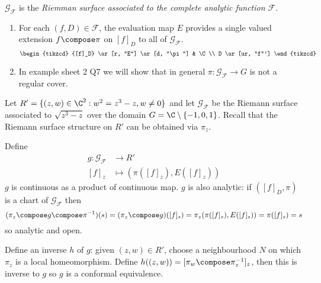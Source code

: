 \documentclass[a4paper]{article}
\begin{document}
\begin{definition}
  \(\mathcal G_{\mathcal F}\) is the \emph{Riemman surface associated to the complete analytic function \(\mathcal F\)}.
\end{definition}

\begin{remark}\leavevmode
  \begin{enumerate}
  \item For each \((f, D) \in \mathcal F\), the evaluation map \(E\) provides a single valued extension \(f \compose \pi\) on \([f]_D\) to all of \(\mathcal G_{\mathcal F}\).
    \[
      \begin{tikzcd}
        {[f]_D} \ar[r, "E"] \ar[d, "\pi"] & \C \\
        D \ar[ur, "f"']
      \end{tikzcd}
    \]
  \item In example sheet 2 Q7 we will show that in general \(\pi: \mathcal G_{\mathcal F} \to G\) is not a regular cover.
  \end{enumerate}
\end{remark}

\begin{eg}
  Let \(R' = \{(z, w) \in \C^2: w^2 = z^3 - z, w \neq 0\}\) and let \(\mathcal G_{\mathcal F}\) be the Riemann surface associated to \(\sqrt{z^3 - z}\) over the domain \(G = \C \setminus\{-1, 0, 1\}\). Recall that the Riemann surface structure on \(R'\) can be obtained via \(\pi_z\).

  Define
  \begin{align*}
    g: \mathcal G_{\mathcal F} &\to R' \\
    [f]_z &\mapsto (\pi([f]_z), E([f]_z))
  \end{align*}
  \(g\) is continuous as a product of continuous map. \(g\) is also analytic: if \(([f]_D, \pi)\) is a chart of \(\mathcal G_{\mathcal F}\) then
  \[
    (\pi_z \compose g \compose \pi^{-1})(s) = (\pi_z \compose g)([f]_s) = \pi_z(\pi([f]_s), E([f]_s)) = \pi([f]_s) = s
  \]
  so analytic and open.

  Define an inverse \(h\) of \(g\): given \((z, w) \in R'\), choose a neighbourhood \(N\) on which \(\pi_z\) is a local homeomorphism. Define \(h((z, w)) = [\pi_w \compose \pi_z^{-1}]_z\), then this is inverse to \(g\) so \(g\) is a conformal equivalence.
\end{eg}
\end{document}
